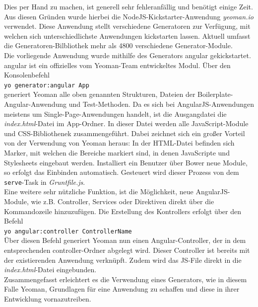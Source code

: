 Dies per Hand zu machen, ist generell sehr fehleranfällig und benötigt einige Zeit. Aus diesen Gründen wurde hierbei die NodeJS-Kickstarter-Anwendung \textit{yeoman.io} verwendet.
Diese Anwendung stellt verschiedene Generatoren zur Verfügung, mit welchen sich unterschiedlichste Anwendungen kickstarten lassen. Aktuell umfasst die Generatoren-Bilbliothek mehr als 4800 verschiedene
Generator-Module.\\
Die vorliegende Anwendung wurde mithilfe des Generators \grqq angular\glqq{}  gekickstartet. \grqq angular\glqq{} ist ein offizielles vom Yeoman-Team entwickeltes Modul.
Über den Konsolenbefehl\\
\texttt{yo generator:angular App}\\
generiert Yeoman alle oben genannten Strukturen, Dateien der Boilerplate-Angular-Anwendung und Test-Methoden.
Da es sich bei AngularJS-Anwendungen meistens um Single-Page-Anwendungen handelt, ist die Ausgangdatei die \textit{index.html}-Datei im App-Ordner.
In dieser Datei werden alle JavaScript-Module und CSS-Bibliothenek zusammengeführt. Dabei zeichnet sich ein großer Vorteil von der Verwendung von Yeoman heraus:
In der HTML-Datei befinden sich Marker, mit welchen die Bereiche markiert sind, in denen JavaScripte und Stylesheets eingebaut werden. Installiert ein Benutzer über Bower neue Module, so erfolgt das Einbinden automatisch.
Gesteuert wird dieser Prozess von dem \texttt{serve}-Task in \textit{Gruntfile.js}.\\
Eine weitere sehr nützliche Funktion, ist die Möglichkeit, neue AngularJS-Module, wie z.B. Controller, Services oder Direktiven direkt über die Kommandozeile hinzuzufügen.
Die Erstellung des Kontrollers erfolgt über den Befehl \\
\texttt{yo angular:controller ControllerName}\\
Über diesen Befehl generiert Yeoman nun einen Angular-Controller, der in dem entsprechenden controller-Ordner abgelegt wird. Dieser Controller ist bereits mit der existierenden Anwendung
 verknüpft. Zudem wird das JS-File direkt in die \textit{index.html}-Datei eingebunden.\\
 Zusammengefasst erleichtert es die Verwendung eines Generators, wie in diesem Falle Yeoman, Grundlagen für eine Anwendung zu schaffen und diese in ihrer Entwicklung vornazutreiben.

